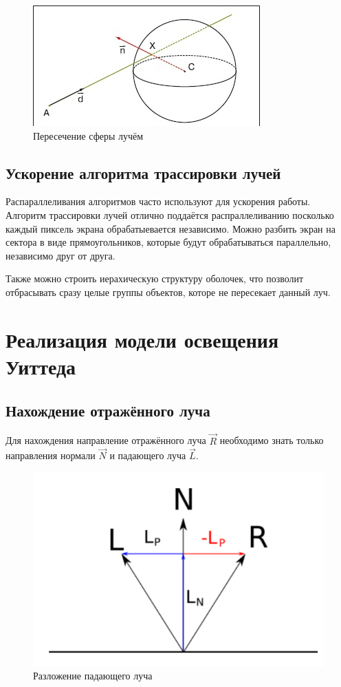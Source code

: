\documentclass[12pt,a4paper,oneside]{report}
\begin{document}
				\begin{figure}[htp]
					\centering
					\includegraphics{sphere}
					\caption{Пересечение сферы лучём}
					\label{fig:sphere}
				\end{figure}
				
			\subsection{Ускорение алгоритма трассировки лучей}
				\quad Распараллеливания алгоритмов часто используют для ускорения работы. Алгоритм трассировки лучей отлично поддаётся распраллеливанию посколько каждый пиксель экрана обрабатыевается независимо. Можно разбить экран на сектора в виде прямоугольников, которые будут обрабатываться параллельно, независимо друг от  друга. 
				
				\quad Также можно строить иерахическую структуру оболочек, что позволит отбрасывать сразу целые группы объектов, которе не пересекает данный луч.
		\section{Реализация модели освещения Уиттеда}
			\subsection{Нахождение отражённого луча}
				\quad Для нахождения направление отражённого луча $\vec{R}$ необходимо знать только направления нормали $\vec{N}$ и падающего луча $\vec{L}$.
				
				\begin{figure}[htp]
					\centering
					\includegraphics[scale=0.5]{reflect}
					\caption{Разложение падающего луча}
					\label{fig:reflect}
				\end{figure}
				
\end{document}
